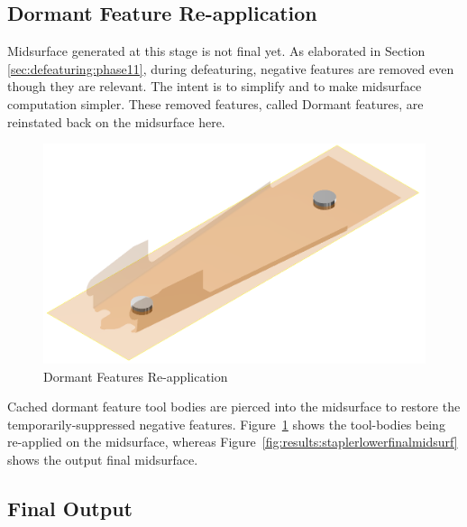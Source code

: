 \subsection{Dormant Feature Re-application}

Midsurface generated at this stage is not final yet. As elaborated in Section \ref{sec:defeaturing:phase11}, during defeaturing, negative features are removed even though they are relevant. The intent is to simplify and to make midsurface computation simpler. These removed features, called Dormant features, are reinstated back on the midsurface here. 


\begin{figure}[!h]
\centering     %
\includegraphics[width=0.62\linewidth,valign=t]{../Common/images/StaplerLower_dormant_model}
\caption{Dormant Features Re-application}
\label{fig:results:staplerlowermidsurfdormant}
\end{figure}


Cached dormant feature tool bodies are pierced into the midsurface to restore the temporarily-suppressed  negative features. Figure~\ref{fig:results:staplerlowermidsurfdormant} shows the tool-bodies being re-applied on the midsurface, whereas Figure~\ref{fig:results:staplerlowerfinalmidsurf} shows the output final midsurface.






\subsection{Final Output}

